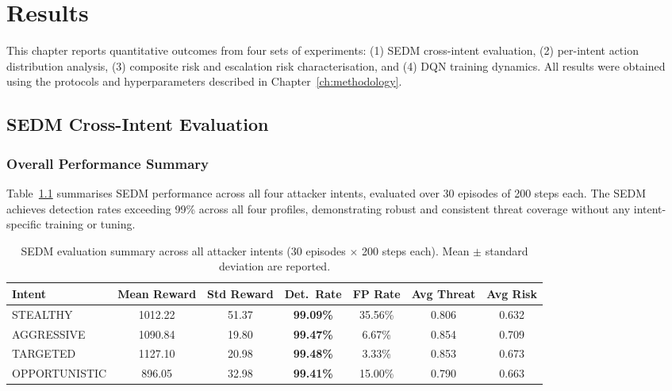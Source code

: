 \chapter{Results}
\label{ch:results}

This chapter reports quantitative outcomes from four sets of experiments:
(1) SEDM cross-intent evaluation,
(2) per-intent action distribution analysis,
(3) composite risk and escalation risk characterisation, and
(4) DQN training dynamics.
All results were obtained using the protocols and hyperparameters described
in Chapter~\ref{ch:methodology}.

\section{SEDM Cross-Intent Evaluation}
\label{sec:results_sedm}

\subsection{Overall Performance Summary}

Table~\ref{tab:eval_summary} summarises SEDM performance across all four
attacker intents, evaluated over 30 episodes of 200 steps each.
The SEDM achieves detection rates exceeding 99\% across all four profiles,
demonstrating robust and consistent threat coverage without any
intent-specific training or tuning.

\begin{table}[ht]
  \centering
  \caption{SEDM evaluation summary across all attacker intents
           (30 episodes $\times$ 200 steps each).
           Mean $\pm$ standard deviation are reported.}
  \label{tab:eval_summary}
  \begin{tabular}{lcccccc}
    \toprule
    Intent & Mean Reward & Std Reward & Det.\ Rate & FP Rate & Avg Threat & Avg Risk \\
    \midrule
    STEALTHY      & 1012.22 & 51.37 & \textbf{99.09\%} & 35.56\% & 0.806 & 0.632 \\
    AGGRESSIVE    & 1090.84 & 19.80 & \textbf{99.47\%} &  6.67\% & 0.854 & 0.709 \\
    TARGETED      & 1127.10 & 20.98 & \textbf{99.48\%} &  3.33\% & 0.853 & 0.673 \\
    OPPORTUNISTIC &  896.05 & 32.98 & \textbf{99.41\%} & 15.00\% & 0.790 & 0.663 \\
    \bottomrule
  \end{tabular}
\end{table}

